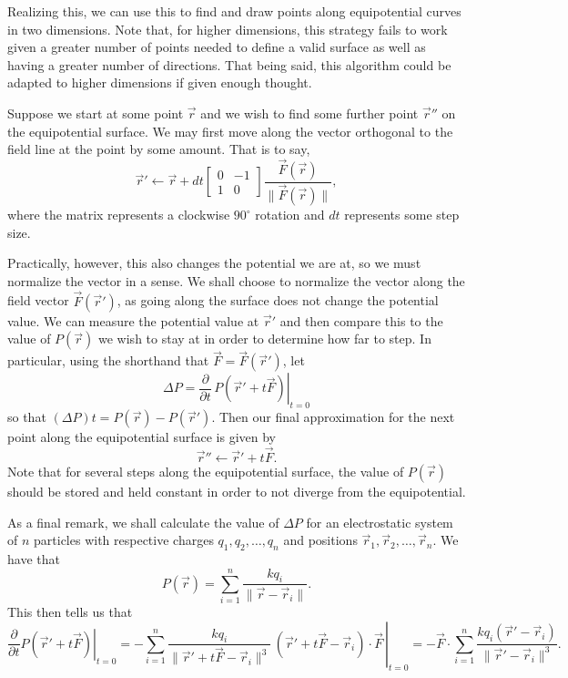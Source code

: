 \documentclass[a4paper, 12pt]{article}
\begin{document}
Realizing this, we can use this to find and draw points along equipotential curves in two dimensions. Note that, for higher dimensions, this strategy fails to work given a greater number of points needed to define a valid surface as well as having a greater number of directions. That being said, this algorithm could be adapted to higher dimensions if given enough thought.

Suppose we start at some point \( \vec{r} \) and we wish to find some further point \( \vec{r}'' \) on the equipotential surface. We may first move along the vector orthogonal to the field line at the point by some amount. That is to say,
\[
    \vec{r}' \leftarrow \vec{r} + dt \begin{bmatrix} 0 & -1 \\ 1 & 0 \end{bmatrix} \frac{\vec{F}(\vec{r})}{\| \vec{F} (\vec{r}) \|}
,\]
where the matrix represents a clockwise \( 90^\circ \) rotation and \( dt \) represents some step size.

Practically, however, this also changes the potential we are at, so we must normalize the vector in a sense. We shall choose to normalize the vector along the field vector \( \vec{F} (\vec{r}') \), as going along the surface does not change the potential value. We can measure the potential value at \( \vec{r}' \) and then compare this to the value of \( P(\vec{r}) \) we wish to stay at in order to determine how far to step. In particular, using the shorthand that \( \vec{F} = \vec{F} (\vec{r}') \), let
\[
    \Delta P = \left. \frac{\partial}{\partial t} \, P(\vec{r}' + t \vec{F}) \right\vert_{t = 0}
\]
so that \( (\Delta P) t = P(\vec{r}) - P(\vec{r}') \). Then our final approximation for the next point along the equipotential surface is given by
\[
    \vec{r}'' \leftarrow \vec{r}' + t \vec{F}
.\]
Note that for several steps along the equipotential surface, the value of \( P(\vec{r}) \) should be stored and held constant in order to not diverge from the equipotential.

As a final remark, we shall calculate the value of \( \Delta P \) for an electrostatic system of \( n \) particles with respective charges \( q_1, q_2, \ldots, q_n \) and positions \( \vec{r}_1, \vec{r}_2, \ldots, \vec{r}_n \). We have that
\[
    P(\vec{r}) = \sum_{i = 1}^{n} \frac{kq_i}{\| \vec{r} - \vec{r}_i \|}
.\]
This then tells us that
\[
    \left. \frac{\partial}{\partial t} P(\vec{r}' + t \vec{F}) \right\vert_{t = 0} = -\left. \sum_{i = 1}^{n} \frac{k q_i}{\| \vec{r}' + t \vec{F} - \vec{r}_i \|^3} \, (\vec{r}' + t \vec{F} - \vec{r}_i) \cdot \vec{F} \, \right\vert_{t = 0} = - \vec{F} \cdot \sum_{i = 1}^{n} \frac{k q_i (\vec{r}' - \vec{r}_i)}{\| \vec{r}' - \vec{r}_i \|^3}
.\]
\end{document}
